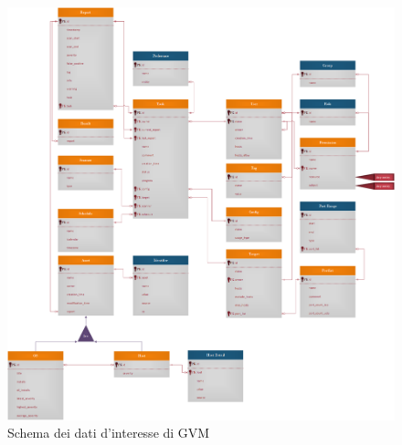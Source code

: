 \begin{itemize}
    \begin{figure}[h!]
        \centering
        \includegraphics[width=\textwidth]{img/er_crow.png}
        \caption{Schema dei dati d'interesse di GVM}
        \label{er-crow}
    \end{figure}


\end{itemize}
